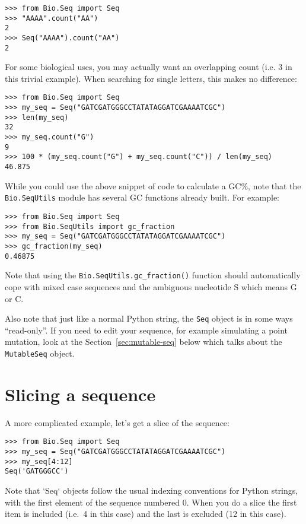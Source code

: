 \begin{verbatim}
>>> from Bio.Seq import Seq
>>> "AAAA".count("AA")
2
>>> Seq("AAAA").count("AA")
2
\end{verbatim}

\noindent For some biological uses, you may actually want an overlapping count
(i.e. $3$ in this trivial example). When searching for single letters, this
makes no difference:

\begin{verbatim}
>>> from Bio.Seq import Seq
>>> my_seq = Seq("GATCGATGGGCCTATATAGGATCGAAAATCGC")
>>> len(my_seq)
32
>>> my_seq.count("G")
9
>>> 100 * (my_seq.count("G") + my_seq.count("C")) / len(my_seq)
46.875
\end{verbatim}

While you could use the above snippet of code to calculate a GC\%, note that  the \verb|Bio.SeqUtils| module has several GC functions already built.  For example:

\begin{verbatim}
>>> from Bio.Seq import Seq
>>> from Bio.SeqUtils import gc_fraction
>>> my_seq = Seq("GATCGATGGGCCTATATAGGATCGAAAATCGC")
>>> gc_fraction(my_seq)
0.46875
\end{verbatim}

\noindent Note that using the \verb|Bio.SeqUtils.gc_fraction()| function should automatically cope with mixed case sequences and the ambiguous nucleotide S which means G or C.

Also note that just like a normal Python string, the \verb|Seq| object is in some ways ``read-only''.  If you need to edit your sequence, for example simulating a point mutation, look at the Section~\ref{sec:mutable-seq} below which talks about the \verb|MutableSeq| object.

\section{Slicing a sequence}

A more complicated example, let's get a slice of the sequence:

\begin{verbatim}
>>> from Bio.Seq import Seq
>>> my_seq = Seq("GATCGATGGGCCTATATAGGATCGAAAATCGC")
>>> my_seq[4:12]
Seq('GATGGGCC')
\end{verbatim}

Note that `Seq` objects follow the usual indexing conventions for Python strings, with the first element of the sequence numbered 0. When you do a slice the first item is included (i.e.~4 in this case) and the last is excluded (12 in this case).

